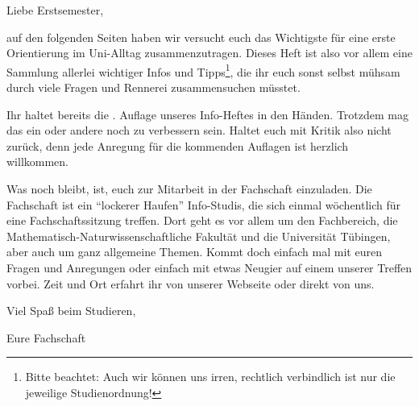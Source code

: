 Liebe Erstsemester,

auf den folgenden Seiten haben wir versucht euch das Wichtigste für eine
erste Orientierung im Uni-Alltag zusammenzutragen. Dieses Heft
ist also vor allem eine Sammlung allerlei wichtiger Infos und Tipps\footnote{
Bitte beachtet: Auch wir können uns irren, rechtlich verbindlich ist nur die
jeweilige Studienordnung!}, die ihr euch sonst selbst mühsam durch viele Fragen
und Rennerei zusammensuchen müsstet.


Ihr haltet bereits die \number\auflage. Auflage unseres Info-Heftes in den
Händen. Trotzdem mag das ein oder andere noch zu verbessern sein. Haltet
euch mit Kritik also nicht zurück, denn jede Anregung für die kommenden
Auf\/lagen ist herzlich willkommen.

Was noch bleibt, ist, euch zur Mitarbeit in der Fachschaft einzuladen.  Die
Fachschaft ist ein "`lockerer Haufen"' Info-Studis, die sich einmal wöchentlich
für eine Fachschaftssitzung treffen. Dort geht es vor allem um den Fachbereich,
die Mathematisch-Naturwissenschaftliche Fakultät und die Universität Tübingen, 
aber auch um ganz allgemeine Themen. Kommt doch einfach mal mit euren Fragen 
und Anregungen oder einfach mit etwas Neugier auf einem unserer Treffen vorbei.  
Zeit und Ort erfahrt ihr von unserer Webseite oder direkt von uns.

\bigskip

Viel Spaß beim Studieren,

Eure Fachschaft
\vfill
\bigskip

\eject
